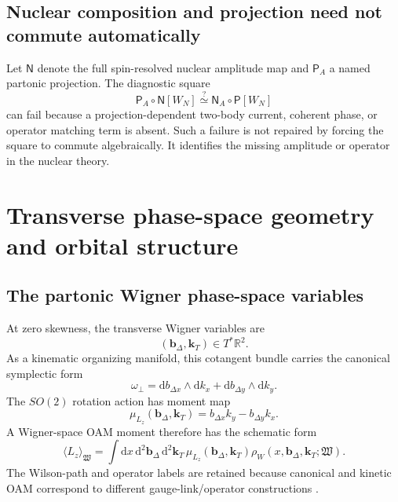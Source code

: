 \documentclass[11pt]{article}
\newcommand{\kT}{\bm{k}_{T}}
\newcommand{\bD}{\bm{b}_{\Delta}}
\newcommand{\dd}{\mathrm{d}}
\begin{document}
\subsection{Nuclear composition and projection need not commute automatically}

Let \(\mathsf N\) denote the full spin-resolved nuclear amplitude map and
\(\mathsf P_A\) a named partonic projection.  The diagnostic square
\begin{equation}
 \mathsf P_A\circ\mathsf N[W_N]
 \stackrel{?}{\simeq}
 \mathsf N_A\circ\mathsf P[W_N]
\label{eq:nuclear-projection-square}
\end{equation}
can fail because a projection-dependent two-body current, coherent phase, or
operator matching term is absent.  Such a failure is not repaired by forcing
the square to commute algebraically.  It identifies the missing amplitude or
operator in the nuclear theory.

\section{Transverse phase-space geometry and orbital structure}
\label{sec:symplectic}

\subsection{The partonic Wigner phase-space variables}

At zero skewness, the transverse Wigner variables are
\begin{equation}
 (\bD,\kT)\in T^*\mathbb R^2.
\label{eq:wigner-phase-space}
\end{equation}
As a kinematic organizing manifold, this cotangent bundle carries the
canonical symplectic form
\begin{equation}
 \omega_\perp
 =\dd b_{\Delta x}\wedge\dd k_x
 +\dd b_{\Delta y}\wedge\dd k_y.
\label{eq:transverse-symplectic-form}
\end{equation}
The \(SO(2)\) rotation action has moment map
\begin{equation}
 \mu_{L_z}(\bD,\kT)
 =b_{\Delta x}k_y-b_{\Delta y}k_x.
\label{eq:transverse-moment-map}
\end{equation}
A Wigner-space OAM moment therefore has the schematic form
\begin{equation}
 \langle L_z\rangle_{\mathfrak W}
 =\int\dd x\,\dd^2\bD\,\dd^2\kT\,
 \mu_{L_z}(\bD,\kT)
 \rho_W(x,\bD,\kT;\mathfrak W).
\label{eq:wigner-oam-moment}
\end{equation}
The Wilson-path and operator labels are retained because canonical and
kinetic OAM correspond to different gauge-link/operator constructions \cite{Lorce2012}.
\end{document}
